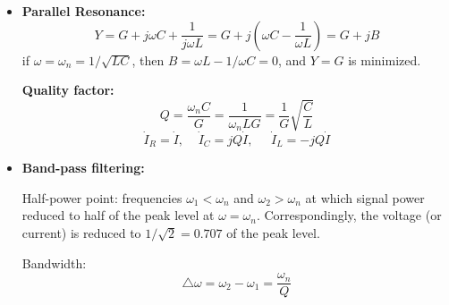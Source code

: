 \documentclass{article}
\begin{document}
\begin{itemize}
{\bf Quality factor:} 
\begin{equation}
  Q=\frac{\omega_n L}{R}=\frac{1}{\omega_n RC}=\frac{1}{R}\sqrt{\frac{L}{C}} 
\end{equation}

\begin{equation}	
  \dot{V}_R=\dot{V},\;\;\;\;\dot{V}_L=jQ\dot{V},\;\;\;\;\;\dot{V}_C=-jQ\dot{V} 
\end{equation}

\item {\bf Parallel Resonance:}
\begin{equation}
  Y=G+j\omega C+\frac{1}{j\omega L}=G+j\left(\omega C-\frac{1}{\omega L}\right)
  =G+jB	
\end{equation}
if $\omega=\omega_n=1/\sqrt{LC}$, then $B=\omega L-1/\omega C=0$, and $Y=G$ is
minimized.

{\bf Quality factor:} 
\begin{equation}
  Q=\frac{\omega_n C}{G}=\frac{1}{\omega_n LG}=\frac{1}{G}\sqrt{\frac{C}{L}} 
\end{equation}
\begin{equation}	
  \dot{I}_R=\dot{I},\;\;\;\;\dot{I}_C=jQ\dot{I},\;\;\;\;\;\dot{I}_L=-jQ\dot{I} 
\end{equation}
\item {\bf Band-pass filtering:}

  Half-power point: frequencies $\omega_1<\omega_n$ and $\omega_2>\omega_n$
  at which signal power reduced to half of the peak level at $\omega=\omega_n$.
  Correspondingly, the voltage (or current) is reduced to $1/\sqrt{2}=0.707$
  of the peak level.
  
  Bandwidth: \begin{equation} \triangle \omega=\omega_2-\omega_1=\frac{\omega_n}{Q} \end{equation}


\end{itemize}
\end{document}
